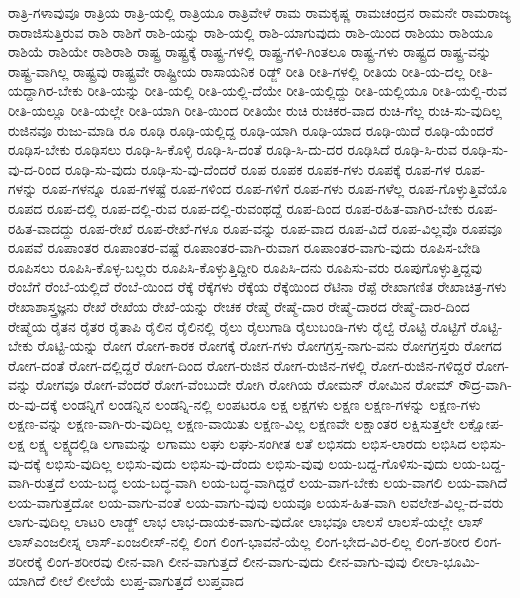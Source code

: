 {ರಾತ್ರಿ-ಗಳಾವುವೂ
ರಾತ್ರಿಯ
ರಾತ್ರಿ-ಯಲ್ಲಿ
ರಾತ್ರಿಯೂ
ರಾತ್ರಿವೇಳೆ
ರಾಮ
ರಾಮಕೃಷ್ಣ
ರಾಮಚಂದ್ರನ
ರಾಮನೇ
ರಾಮರಾಜ್ಯ
ರಾರಾಜಿಸುತ್ತಿರುವ
ರಾಶಿ
ರಾಶಿಗೆ
ರಾಶಿ-ಯನ್ನು
ರಾಶಿ-ಯಲ್ಲಿ
ರಾಶಿ-ಯಾಗುವುದು
ರಾಶಿ-ಯಿಂದ
ರಾಶಿಯು
ರಾಶಿಯೂ
ರಾಶಿಯೆ
ರಾಶಿಯೇ
ರಾಶಿರಾಶಿ
ರಾಷ್ಟ್ರ
ರಾಷ್ಟ್ರಕ್ಕೆ
ರಾಷ್ಟ್ರ-ಗಳಲ್ಲಿ
ರಾಷ್ಟ್ರ-ಗಳಿ-ಗಿಂತಲೂ
ರಾಷ್ಟ್ರ-ಗಳು
ರಾಷ್ಟ್ರದ
ರಾಷ್ಟ್ರ-ವನ್ನು
ರಾಷ್ಟ್ರ-ವಾಗಿಲ್ಲ
ರಾಷ್ಟ್ರವು
ರಾಷ್ಟ್ರವೇ
ರಾಷ್ಟ್ರೀಯ
ರಾಸಾಯನಿಕ
ರಿಡ್ಜ್
ರೀತಿ
ರೀತಿ-ಗಳಲ್ಲಿ
ರೀತಿಯ
ರೀತಿ-ಯ-ದಲ್ಲ
ರೀತಿ-ಯದ್ದಾಗಿರ-ಬೇಕು
ರೀತಿ-ಯನ್ನು
ರೀತಿ-ಯಲ್ಲಿ
ರೀತಿ-ಯಲ್ಲಿ-ದೆಯೇ
ರೀತಿ-ಯಲ್ಲಿದ್ದು
ರೀತಿ-ಯಲ್ಲಿಯೂ
ರೀತಿ-ಯಲ್ಲಿ-ರುವ
ರೀತಿ-ಯಲ್ಲೂ
ರೀತಿ-ಯಲ್ಲೇ
ರೀತಿ-ಯಾಗಿ
ರೀತಿ-ಯಿಂದ
ರೀತಿಯೇ
ರುಚಿ
ರುಚಿಕರ-ವಾದ
ರುಚಿ-ಗೆಲ್ಲ
ರುಚಿ-ಸು-ವುದಿಲ್ಲ
ರುಜಿನವೂ
ರುಜು-ಮಾಡಿ
ರೂ
ರೂಢಿ
ರೂಢಿ-ಯಲ್ಲಿದ್ದ
ರೂಢಿ-ಯಾಗಿ
ರೂಢಿ-ಯಾದ
ರೂಢಿ-ಯಿದೆ
ರೂಢಿ-ಯೆಂದರೆ
ರೂಢಿಸ-ಬೇಕು
ರೂಢಿಸಲು
ರೂಢಿ-ಸಿ-ಕೊಳ್ಳಿ
ರೂಢಿ-ಸಿ-ದಂತೆ
ರೂಢಿ-ಸಿ-ದು-ದರ
ರೂಢಿಸಿದೆ
ರೂಢಿ-ಸಿ-ರುವ
ರೂಢಿ-ಸು-ವು-ದ-ರಿಂದ
ರೂಢಿ-ಸು-ವುದು
ರೂಢಿ-ಸು-ವು-ದೆಂದರೆ
ರೂಪ
ರೂಪಕ
ರೂಪಕ-ಗಳು
ರೂಪಕ್ಕೆ
ರೂಪ-ಗಳ
ರೂಪ-ಗಳನ್ನು
ರೂಪ-ಗಳನ್ನೂ
ರೂಪ-ಗಳಷ್ಟೆ
ರೂಪ-ಗಳಿಂದ
ರೂಪ-ಗಳಿಗೆ
ರೂಪ-ಗಳು
ರೂಪ-ಗಳೆಲ್ಲ
ರೂಪ-ಗೊಳ್ಳುತ್ತಿವೆಯೊ
ರೂಪದ
ರೂಪ-ದಲ್ಲಿ
ರೂಪ-ದಲ್ಲಿ-ರುವ
ರೂಪ-ದಲ್ಲಿ-ರುವಂಥದ್ದೆ
ರೂಪ-ದಿಂದ
ರೂಪ-ರಹಿತ-ವಾಗಿರ-ಬೇಕು
ರೂಪ-ರಹಿತ-ವಾದದ್ದು
ರೂಪ-ರೇಖೆ
ರೂಪ-ರೇಖೆ-ಗಳೂ
ರೂಪ-ವನ್ನು
ರೂಪ-ವಾದ
ರೂಪ-ವಿದೆ
ರೂಪ-ವಿಲ್ಲವೊ
ರೂಪವೂ
ರೂಪವೆ
ರೂಪಾಂತರ
ರೂಪಾಂತರ-ವಷ್ಟೆ
ರೂಪಾಂತರ-ವಾಗಿ-ರುವಾಗ
ರೂಪಾಂತರ-ವಾಗು-ವುದು
ರೂಪಿಸ-ಬೇಡಿ
ರೂಪಿಸಲು
ರೂಪಿಸಿ-ಕೊಳ್ಳ-ಬಲ್ಲರು
ರೂಪಿಸಿ-ಕೊಳ್ಳುತ್ತಿದ್ದೀರಿ
ರೂಪಿಸಿ-ದನು
ರೂಪಿಸು-ವರು
ರೂಪುಗೊಳ್ಳುತ್ತಿದ್ದವು
ರೆಂಬೆಗೆ
ರೆಂಬೆ-ಯಲ್ಲಿದೆ
ರೆಂಬೆ-ಯಿಂದ
ರೆಕ್ಕೆ
ರೆಕ್ಕೆಗಳು
ರೆಕ್ಕೆಯ
ರೆಕ್ಕೆಯಿಂದ
ರೆಟಿನಾ
ರೆಪ್ಪೆ
ರೇಖಾಗಣಿತ
ರೇಖಾಚಿತ್ರ-ಗಳು
ರೇಖಾಶಾಸ್ತ್ರಜ್ಞನು
ರೇಖೆ
ರೇಖೆಯ
ರೇಖೆ-ಯನ್ನು
ರೇಚಕ
ರೇಷ್ಮೆ
ರೇಷ್ಮೆ-ದಾರ
ರೇಷ್ಮೆ-ದಾರದ
ರೇಷ್ಮೆ-ದಾರ-ದಿಂದ
ರೇಷ್ಮೆಯ
ರೈತನ
ರೈತರ
ರೈತಾಪಿ
ರೈಲಿನ
ರೈಲಿನಲ್ಲಿ
ರೈಲು
ರೈಲುಗಾಡಿ
ರೈಲುಬಂಡಿ-ಗಳು
ರೈಲ್ವೆ
ರೊಟ್ಟಿ
ರೊಟ್ಟಿಗೆ
ರೊಟ್ಟಿ-ಬೇಕು
ರೊಟ್ಟಿ-ಯನ್ನು
ರೋಗ
ರೋಗ-ಕಾರಕ
ರೋಗಕ್ಕೆ
ರೋಗ-ಗಳು
ರೋಗಗ್ರಸ್ತ-ನಾಗು-ವನು
ರೋಗಗ್ರಸ್ತರು
ರೋಗದ
ರೋಗ-ದಂತೆ
ರೋಗ-ದಲ್ಲಿದ್ದರೆ
ರೋಗ-ದಿಂದ
ರೋಗ-ರುಜಿನ
ರೋಗ-ರುಜಿನ-ಗಳಲ್ಲಿ
ರೋಗ-ರುಜಿನ-ಗಳಿದ್ದರೆ
ರೋಗ-ವನ್ನು
ರೋಗವೂ
ರೋಗ-ವೆಂದರೆ
ರೋಗ-ವೆಂಬುದೇ
ರೋಗಿ
ರೋಗಿಯ
ರೋಮನ್
ರೋಮಿನ
ರೋಮ್
ರೌದ್ರ-ವಾಗಿ-ರು-ವು-ದಕ್ಕೆ
ಲಂಡನ್ನಿಗೆ
ಲಂಡನ್ನಿನ
ಲಂಡನ್ನಿ-ನಲ್ಲಿ
ಲಂಪಟರೂ
ಲಕ್ಷ
ಲಕ್ಷಗಳು
ಲಕ್ಷಣ
ಲಕ್ಷಣ-ಗಳನ್ನು
ಲಕ್ಷಣ-ಗಳು
ಲಕ್ಷಣ-ವನ್ನು
ಲಕ್ಷಣ-ವಾಗಿ-ರು-ವುದಿಲ್ಲ
ಲಕ್ಷಣ-ವಾಯಿತು
ಲಕ್ಷಣ-ವಿಲ್ಲ
ಲಕ್ಷಣವೇ
ಲಕ್ಷಾಂತರ
ಲಕ್ಷಿಸುತ್ತಲೇ
ಲಕ್ಷೋಪ-ಲಕ್ಷ
ಲಕ್ಷ್ಯ
ಲಕ್ಷ್ಯದಲ್ಲಿಡಿ
ಲಗಾಮನ್ನು
ಲಗಾಮು
ಲಘು
ಲಘು-ಸಂಗೀತ
ಲತೆ
ಲಭಿಸದು
ಲಭಿಸ-ಲಾರದು
ಲಭಿಸಿದ
ಲಭಿಸು-ವು-ದಕ್ಕೆ
ಲಭಿಸು-ವುದಿಲ್ಲ
ಲಭಿಸು-ವುದು
ಲಭಿಸು-ವು-ದೆಂದು
ಲಭಿಸು-ವುವು
ಲಯ-ಬದ್ದ-ಗೊಳಿಸು-ವುದು
ಲಯ-ಬದ್ದ-ವಾಗಿ-ರುತ್ತದೆ
ಲಯ-ಬದ್ಧ
ಲಯ-ಬದ್ಧ-ವಾಗಿ
ಲಯ-ಬದ್ಧ-ವಾಗಿದ್ದರೆ
ಲಯ-ವಾಗ-ಬೇಕು
ಲಯ-ವಾಗಲಿ
ಲಯ-ವಾಗಿದೆ
ಲಯ-ವಾಗುತ್ತದೋ
ಲಯ-ವಾಗು-ವಂತೆ
ಲಯ-ವಾಗು-ವುವು
ಲಯವೂ
ಲಯಸ-ಹಿತ-ವಾಗಿ
ಲವಲೇಶ-ವಿಲ್ಲ-ದ-ವರು
ಲಾಗು-ವುದಿಲ್ಲ
ಲಾಟರಿ
ಲಾಡ್ಜ್
ಲಾಭ
ಲಾಭ-ದಾಯಕ-ವಾಗು-ವುದೋ
ಲಾಭವೂ
ಲಾಲಸೆ
ಲಾಲಸೆ-ಯಲ್ಲೇ
ಲಾಸ್
ಲಾಸ್ಎಂಜಲೀಸ್ನ
ಲಾಸ್-ಏಂಜಲೀಸ್-ನಲ್ಲಿ
ಲಿಂಗ
ಲಿಂಗ-ಭಾವನೆ-ಯೆಲ್ಲ
ಲಿಂಗ-ಭೇದ-ವಿರ-ಲಿಲ್ಲ
ಲಿಂಗ-ಶರೀರ
ಲಿಂಗ-ಶರೀರಕ್ಕೆ
ಲಿಂಗ-ಶರೀರವು
ಲೀನ-ವಾಗಿ
ಲೀನ-ವಾಗುತ್ತದೆ
ಲೀನ-ವಾಗು-ವುದು
ಲೀನ-ವಾಗು-ವುವು
ಲೀಲಾ-ಭೂಮಿ-ಯಾಗಿದೆ
ಲೀಲೆ
ಲೀಲೆಯೆ
ಲುಪ್ತ-ವಾಗುತ್ತದೆ
ಲುಪ್ತವಾದ
}

